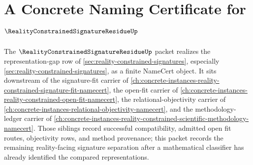 \chapter{A Concrete Naming Certificate for $\RealityConstrainedSignatureResidueUp$}
\label{ch:concrete-instances-reality-constrained-signature-residue-namecert}

The $\RealityConstrainedSignatureResidueUp$ packet realizes the representation-gap row of \autoref{sec:reality-constrained-signatures}, especially \autoref{sec:reality-constrained-signatures}, as a finite NameCert object. It sits downstream of the signature-fit carrier of \autoref{ch:concrete-instances-reality-constrained-signature-fit-namecert}, the open-fit carrier of \autoref{ch:concrete-instances-reality-constrained-open-fit-namecert}, the relational-objectivity carrier of \autoref{ch:concrete-instances-relational-objectivity-namecert}, and the methodology-ledger carrier of \autoref{ch:concrete-instances-reality-constrained-scientific-methodology-namecert}. Those siblings record successful compatibility, admitted open fit routes, objectivity rows, and method provenance; this packet records the remaining reality-facing signature separation after a mathematical classifier has already identified the compared representations.

